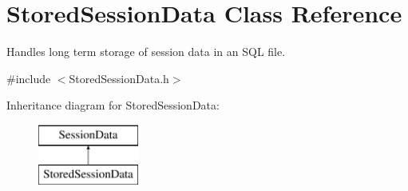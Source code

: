 \hypertarget{class_stored_session_data}{\section{Stored\-Session\-Data Class Reference}
\label{class_stored_session_data}
}


Handles long term storage of session data in an S\-Q\-L file.  




{\ttfamily \#include $<$Stored\-Session\-Data.\-h$>$}

Inheritance diagram for Stored\-Session\-Data\-:\begin{figure}[H]
\begin{center}
\leavevmode
\includegraphics[height=2.000000cm]{class_stored_session_data}
\end{center}
\end{figure}
